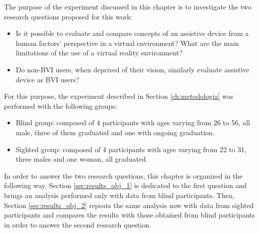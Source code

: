 

The purpose of the experiment discussed in this chapter is to investigate the two research questions proposed for this work:

\begin{itemize}%
    \item Is it possible to evaluate and compare concepts of an assistive device from a human factors' perspective in a virtual environment? What are the main limitations of the use of a virtual reality environment?
    \item Do non-BVI users, when deprived of their vision, similarly evaluate assistive device as BVI users?
\end{itemize}

For this purpose, the experiment described in Section \ref{ch:metodologia} was performed with the following groups:

\begin{itemize}
    \item Blind group: composed of 4 participants with ages varying from 26 to 56, all male, three of them graduated and one with ongoing graduation. 

    \item Sighted group: composed of 4 participants with ages varying from 22 to 31, three males and one woman, all graduated.
\end{itemize}

In order to answer the two research questions, this chapter is organized in the following way. Section \ref{sec:results_obj_1} is dedicated to the first question and brings an analysis performed only with data from blind participants. Then, Section \ref{sec:results_obj_2} repeats the same analysis now with data from sighted participants and compares the results with those obtained from blind participants in order to answer the second research question.

